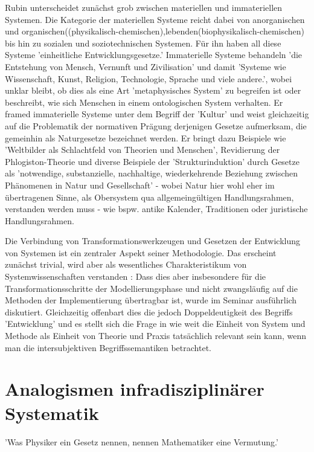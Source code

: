 \documentclass[a4paper,11pt]{article}
\begin{document}
Rubin unterscheidet zunächst grob zwischen materiellen und immateriellen Systemen. Die Kategorie der materiellen
Systeme reicht dabei von anorganischen und 
organischen((physikalisch-chemischen),lebenden(biophysikalisch-chemischen) bis hin zu sozialen und soziotechnischen
Systemen.  
Für ihn haben all diese Systeme 'einheitliche Entwicklungsgesetze.'\cite{Rubin2002}
Immaterielle Systeme behandeln 'die Entstehung von Mensch, Vernunft und Zivilisation'\cite{Rubin2006} und damit
'Systeme wie Wissenschaft, Kunst, Religion, Technologie, Sprache und viele andere.'\cite{Rubin2006}, wobei unklar
bleibt, ob dies als eine Art 'metaphysisches System' zu begreifen ist oder beschreibt, wie sich Menschen in einem
ontologischen System verhalten. Er framed immaterielle Systeme unter dem Begriff der 'Kultur' und weist
gleichzeitig auf die Problematik der normativen Prägung derjenigen Gesetze aufmerksam, die gemeinhin als
Naturgesetze bezeichnet werden. Er bringt dazu Beispiele wie 'Weltbilder als Schlachtfeld von Theorien und
Menschen', Revidierung der Phlogiston-Theorie und diverse Beispiele der 'Strukturinduktion' durch Gesetze als
'notwendige, substanzielle, nachhaltige, wiederkehrende Beziehung zwischen Phänomenen in Natur und Gesellschaft' -
wobei Natur hier wohl eher im übertragenen Sinne, als Obersystem qua allgemeingültigen Handlungsrahmen, verstanden
werden muss - wie bspw. antike Kalender, Traditionen oder juristische Handlungsrahmen.


Die Verbindung von Transformationswerkzeugen und Gesetzen der Entwicklung von Systemen ist ein zentraler Aspekt
seiner Methodologie. Das erscheint zunächst trivial, wird aber als wesentliches Charakteristikum von
Systemwissenschaften verstanden \cite{Kleemann2002}:
Dass dies aber insbesondere für die Transformationsschritte der Modellierungsphase und nicht zwangsläufig auf die
Methoden der Implementierung 
übertragbar ist, wurde im Seminar\cite{LeipzigSeminar2021} ausführlich diskutiert. Gleichzeitig offenbart dies die
jedoch Doppeldeutigkeit des Begriffs 'Entwicklung' und es stellt sich die Frage in wie weit die Einheit von System
und Methode als Einheit von Theorie und Praxis tatsächlich relevant sein kann, wenn man die intersubjektiven Begriffssemantiken betrachtet.


\section{Analogismen infradisziplinärer Systematik}
'Was Physiker ein Gesetz nennen, nennen Mathematiker eine Vermutung.'\cite{Aaronson}
\end{document}
